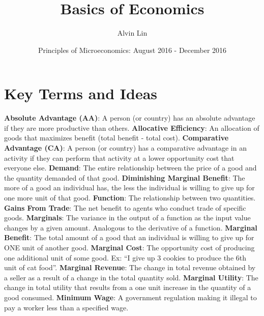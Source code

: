 \documentclass{article}
\title{Basics of Economics}
\author{Alvin Lin}
\date{Principles of Microeconomics: August 2016 - December 2016}
\begin{document}
\maketitle

\section{Key Terms and Ideas}
\textbf{Absolute Advantage (AA)}: A person (or country) has an absolute
advantage if they are more productive than others.
\newline
\textbf{Allocative Efficiency}: An allocation of goods that maximizes benefit
(total benefit - total cost).
\newline
\textbf{Comparative Advantage (CA)}: A person (or country) has a comparative
advantage in an activity if they can perform that activity at a lower
opportunity cost that everyone else.
\newline
\textbf{Demand}: The entire relationship between the price of a good and the
quantity demanded of that good.
\newline
\textbf{Diminishing Marginal Benefit}: The more of a good an individual has,
the less the individual is willing to give up for one more unit of that good.
\newline
\textbf{Function}: The relationship between two quantities.
\newline
\textbf{Gains From Trade}: The net benefit to agents who conduct trade of
specific goods.
\newline
\textbf{Marginals}: The variance in the output of a function as the input value
changes by a given amount. Analogous to the derivative of a function.
\newline
\textbf{Marginal Benefit}: The total amount of a good that an individual is
willing to give up for ONE unit of another good.
\newline
\textbf{Marginal Cost}: The opportunity cost of producing one additional unit
of some good. Ex: ``I give up 3 cookies to produce the 6th unit of cat food''.
\newline
\textbf{Marginal Revenue}: The change in total revenue obtained by a seller
as a result of a change in the total quantity sold.
\newline
\textbf{Marginal Utility}: The change in total utility that results from a
one unit increase in the quantity of a good consumed.
\newline
\textbf{Minimum Wage}: A government regulation making it illegal to pay a
worker less than a specified wage.
\end{document}
